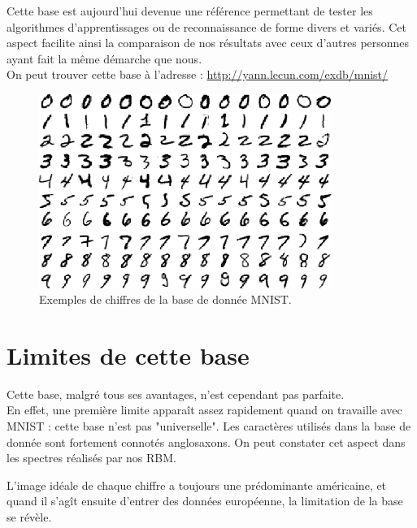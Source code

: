\documentclass[a4paper,oneside]{report}
\begin{document}
                Cette base est aujourd'hui devenue une référence permettant de tester les algorithmes 
d'apprentissages ou de reconnaissance de forme divers et variés. Cet aspect facilite 
ainsi la comparaison de nos 
résultats avec ceux d'autres personnes ayant fait la même démarche que nous.\\   
On peut trouver cette base à l'adresse : \url{http://yann.lecun.com/exdb/mnist/}\\

                \begin{figure}[!h]
                    \begin{center}
                        \includegraphics[width = 270pt]{Images/mnist-01.png}
                    \end{center}
                    \caption{Exemples de chiffres de la base de donnée MNIST.}
                \end{figure}

\newpage
            \section{Limites de cette base}

                Cette base, malgré tous ses avantages, n'est cependant pas parfaite.\\

                En effet, une première limite apparaît assez rapidement quand on travaille avec MNIST 
: cette base n'est pas "universelle". Les caractères utilisés dans la base de donnée 
sont fortement connotés 
anglosaxons. On peut constater cet aspect dans les spectres réalisés par nos RBM.

                L'image idéale de chaque chiffre a toujours une prédominante américaine, et quand il 
s'agît ensuite d'entrer des données européenne, la limitation de la base se révèle.\\
\end{document}
